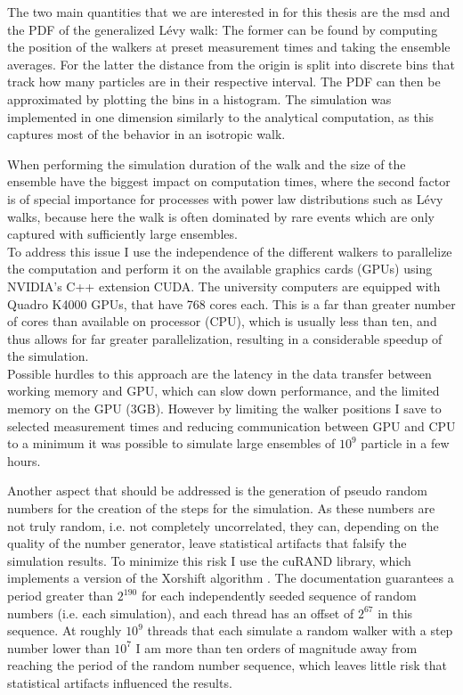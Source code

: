 The two main quantities that we are interested in for this thesis are the \gls{msd} and the \gls{PDF} of the generalized L\'evy walk: The former can be found by computing the position of the walkers at preset measurement times and taking the ensemble averages. For the latter the distance from the origin is split into discrete bins that track how many particles are in their respective interval. The \gls{PDF} can then be approximated by plotting the bins in a histogram. The simulation was implemented in one dimension similarly to the analytical computation, as this captures most of the behavior in an isotropic walk. 

When performing the simulation duration of the walk and the size of the ensemble have the biggest impact on computation times, where the second factor is of special importance for processes with power law distributions such as L\'evy walks, because here the walk is often dominated by rare events which are only captured with sufficiently large ensembles. \\
To address this issue I use the independence of the different walkers to parallelize the computation and perform it on the available graphics cards (GPUs) using NVIDIA's C++ extension CUDA. The university computers are equipped with Quadro K4000 GPUs, that have 768 cores each. This is a far than greater number of cores than available on processor (CPU), which is usually less than ten, and thus allows for far greater parallelization, resulting in a considerable speedup of the simulation.  \\
Possible hurdles to this approach are the latency in the data transfer between working memory and GPU, which can slow down performance, and the limited memory on the GPU (3GB). However by limiting the walker positions I save to selected measurement times and reducing communication between GPU and CPU to a minimum it was possible to simulate large ensembles of $10^9$ particle in a few hours. 

Another aspect that should be addressed is the generation of pseudo random numbers for the creation of the steps for the simulation. As these numbers are not truly random, i.e. not completely uncorrelated, they can, depending on the quality of the number generator, leave statistical artifacts that falsify the simulation results. To minimize this risk I use the cuRAND library, which implements a version of the Xorshift algorithm \cite{marsaglia2003xorshift}. The documentation guarantees a period greater than $2^{190}$ for each independently seeded sequence of random numbers (i.e. each simulation), and each thread has an offset of $2^{67}$ in this sequence. At roughly $10^{9}$ threads that each simulate a random walker with a step number lower than $10^{7}$ I am more than ten orders of magnitude away from reaching the period of the random number sequence, which leaves little risk that statistical artifacts influenced the results.
